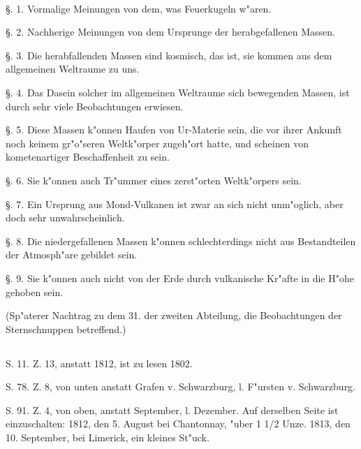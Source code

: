 \documentclass[a4paper, 11pt, oneside, polutonikogreek, german]{article}
\begin{document}
\paragraph{}
§. 1. Vormalige Meinungen von dem, was Feuerkugeln w"aren.

§. 2. Nachherige Meinungen von dem Ursprunge der herabgefallenen Massen.

§. 3. Die herabfallenden Massen sind kosmisch, das ist, sie kommen aus dem allgemeinen Weltraume zu uns.

§. 4. Das Dasein solcher im allgemeinen Weltraume sich bewegenden Massen, ist durch sehr viele Beobachtungen erwiesen.

§. 5. Diese Massen k"onnen Haufen von Ur-Materie sein, die vor ihrer Ankunft noch keinem gr"o"seren Weltk"orper zugeh"ort hatte, und scheinen von kometenartiger Beschaffenheit zu sein.

§. 6. Sie k"onnen auch Tr"ummer eines zerst"orten Weltk"orpers sein.

§. 7. Ein Ursprung aus Mond-Vulkanen ist zwar an sich nicht unm"oglich, aber doch sehr unwahrscheinlich.

§. 8. Die niedergefallenen Massen k"onnen schlechterdings nicht aus Bestandteilen der Atmosph"are gebildet sein.

§. 9. Sie k"onnen auch nicht von der Erde durch vulkanische Kr"afte in die H"ohe gehoben sein.

(Sp"aterer Nachtrag zu dem 31. der zweiten Abteilung, die Beobachtungen der Sternschnuppen betreffend.)

\subsection*{}
\clearpage
\subsection*{}
\paragraph{}
S. 11. Z. 13, anstatt 1812, ist zu lesen 1802.

S. 78. Z. 8, von unten anstatt Grafen v. Schwarzburg, l. F"ursten v. Schwarzburg.

S. 91. Z. 4, von oben, anstatt September, l. Dezember. Auf derselben Seite ist einzuschalten: 1812, den 5. August bei Chantonnay, "uber 1 1/2 Unze. 1813, den 10. September, bei Limerick, ein kleines St"uck.
\end{document}
